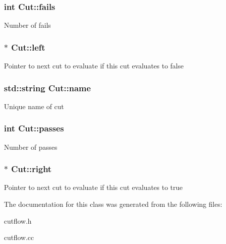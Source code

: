 \subsubsection[{\texorpdfstring{fails}{fails}}]{\setlength{\rightskip}{0pt plus 5cm}int Cut\+::fails}\hypertarget{classCut_a7bfcec46b8c2879a9660ac7656ed7b83}{}\label{classCut_a7bfcec46b8c2879a9660ac7656ed7b83}
Number of fails 
\subsubsection[{\texorpdfstring{left}{left}}]{$\ast$ Cut\+::left}\hypertarget{classCut_a2c65e372172dfa0f705d117d3ad0f668}{}\label{classCut_a2c65e372172dfa0f705d117d3ad0f668}
Pointer to next cut to evaluate if this cut evaluates to false 
\subsubsection[{\texorpdfstring{name}{name}}]{\setlength{\rightskip}{0pt plus 5cm}std\+::string Cut\+::name}\hypertarget{classCut_accf700d2d00746b97a265d4aea3f55c2}{}\label{classCut_accf700d2d00746b97a265d4aea3f55c2}
Unique name of cut 
\subsubsection[{\texorpdfstring{passes}{passes}}]{\setlength{\rightskip}{0pt plus 5cm}int Cut\+::passes}\hypertarget{classCut_a9ec802667c770787a473c622208ef35c}{}\label{classCut_a9ec802667c770787a473c622208ef35c}
Number of passes 
\subsubsection[{\texorpdfstring{right}{right}}]{$\ast$ Cut\+::right}\hypertarget{classCut_a2142ffe68028bb0c211408c0f5bb8bfb}{}\label{classCut_a2142ffe68028bb0c211408c0f5bb8bfb}
Pointer to next cut to evaluate if this cut evaluates to true 

The documentation for this class was generated from the following files\+:\begin{DoxyCompactItemize}
\item 
cutflow.\+h\item 
cutflow.\+cc\end{DoxyCompactItemize}
